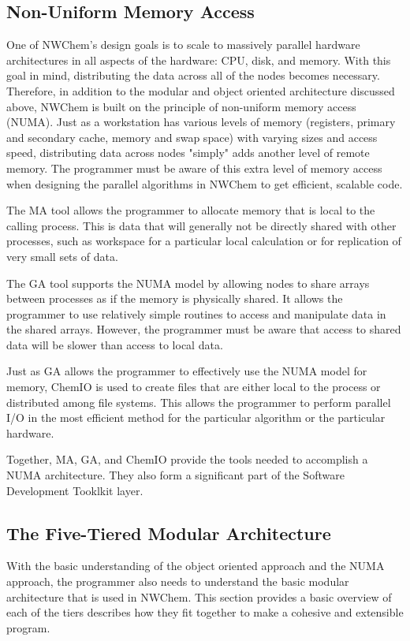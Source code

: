 \subsection{Non-Uniform Memory Access}

One of NWChem's design goals is to scale to massively parallel
hardware architectures in all aspects of the hardware: CPU, disk,
and memory.  With this goal in mind, distributing the data across
all of the nodes becomes necessary.
Therefore, in addition to the modular and object oriented architecture discussed
above, NWChem is built on the principle of non-uniform memory access (NUMA).
Just as a workstation has various levels of memory (registers, primary
and secondary cache, memory and swap space) with varying sizes and access
speed, distributing data across
nodes "simply" adds another level of remote memory.  The
programmer must be aware of this extra level of memory access when
designing the parallel algorithms in NWChem to get efficient, scalable
code.

The MA tool allows the programmer to allocate memory that is local to
the calling process.  This is data that will generally not be directly
shared with other processes, such as workspace for a particular local
calculation or for replication of very small sets of data.

The GA tool supports the NUMA model by allowing nodes to share arrays between
processes as if the memory is physically shared.  It allows the
programmer to use relatively simple routines to access and manipulate
data in the shared arrays.  However, the programmer must 
be aware that access to shared data will be slower than access
to local data.

Just as GA allows the programmer to effectively use the NUMA model for
memory, ChemIO is used to create files that are either local to the
process or
distributed among file systems.  This allows the programmer to perform
parallel I/O in the most efficient method for the particular
algorithm or the particular hardware.

Together, MA, GA, and ChemIO provide the tools needed to accomplish a
NUMA architecture.  They also form a significant part of the Software
Development Tooklkit layer.

\subsection{The Five-Tiered Modular Architecture}

With the basic understanding of the object oriented approach and the
NUMA approach, the programmer also needs to understand the basic
modular architecture that is used in NWChem.  This section provides a
basic overview of each of the tiers describes how 
they fit together to make a cohesive and extensible program.

